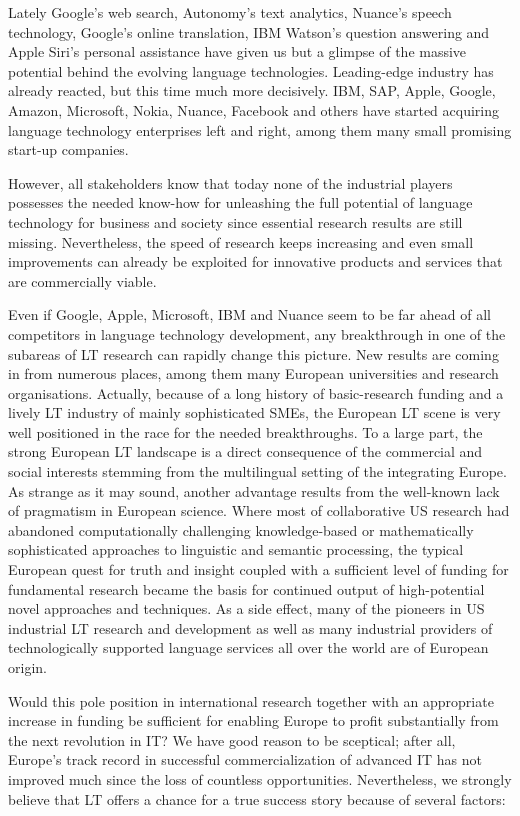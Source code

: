 \begin{multicols}{2}
Lately Google’s web search, Autonomy’s text analytics, Nuance’s speech technology, Google’s online translation, IBM Watson’s question answering and Apple Siri’s personal assistance have given us but a glimpse of the massive potential behind the evolving language technologies. Leading-edge industry has already reacted, but this time much more decisively. IBM, SAP, Apple, Google, Amazon, Microsoft, Nokia, Nuance, Facebook and others have started acquiring language technology enterprises left and right, among them many small promising start-up companies.  

However, all stakeholders know that today none of the industrial players possesses the needed know-how for unleashing the full potential of language technology for business and society since essential research results are still missing. Nevertheless, the speed of research keeps increasing and even small improvements can already be exploited for innovative products and services that are commercially viable.

Even if Google, Apple, Microsoft, IBM and Nuance seem to be far ahead of all competitors in language technology development, any breakthrough in one of the subareas of LT research can rapidly change this picture. New results are coming in from numerous places, among them many European universities and research organisations. Actually, because of a long history of basic-research funding and a lively LT industry of mainly sophisticated SMEs, the European LT scene is very well positioned in the race for the needed breakthroughs. To a large part, the strong European LT landscape is a direct consequence of the commercial and social interests stemming from the multilingual setting of the integrating Europe. As strange as it may sound, another advantage results from the well-known lack of pragmatism in European science. Where most of collaborative US research had abandoned computationally challenging knowledge-based or mathematically sophisticated approaches to linguistic and semantic processing, the typical European quest for truth and insight coupled with a sufficient level of funding for fundamental research became the basis for continued output of high-potential novel approaches and techniques. As a side effect, many of the pioneers in US industrial LT research and development as well as many industrial providers of technologically supported language services all over the world are of European origin.  

Would this pole position in international research together with an appropriate increase in funding be sufficient for enabling Europe to profit substantially from the next revolution in IT? We have good reason to be sceptical; after all, Europe’s track record in successful commercialization of advanced IT has not improved much since the loss of countless opportunities. Nevertheless, we strongly believe that LT offers a chance for a true success story because of several factors:


\end{multicols}
